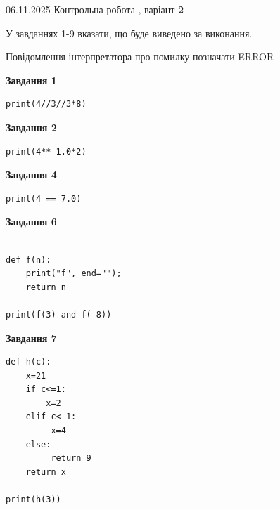 \documentclass[12pt, ukrainian]{article}
\begin{document}
{\Large{06.11.2025 Контрольна робота , варіант  \No \textbf { 2 }\par}}
{
\begin {large}
У завданнях 1-9 вказати, що буде виведено за виконання.

Повідомлення інтерпретатора про помилку позначати ERROR

\begin{minipage}[t]{7.5cm}

\begin{center}
\textbf{Завдання 1}
\end{center}

\begin{verbatim}
print(4//3//3*8)
\end{verbatim}



\begin{center}
\textbf{Завдання 2}
\end{center}

\begin{verbatim}
print(4**-1.0*2)
\end{verbatim}



\begin{center}
\textbf{Завдання 4}
\end{center}

\begin{verbatim}
print(4 == 7.0)
\end{verbatim}



\begin{center}
\textbf{Завдання 6}
\end{center}

\begin{verbatim}

def f(n):
    print("f", end="");
    return n

print(f(3) and f(-8))
\end{verbatim}



\begin{center}
\textbf{Завдання 7}
\end{center}

\begin{verbatim}
def h(c):
    x=21
    if c<=1: 
        x=2
    elif c<-1:
         x=4
    else:
         return 9
    return x

print(h(3))
\end{verbatim}


\end{minipage}
\end{large}}
\end{document}
